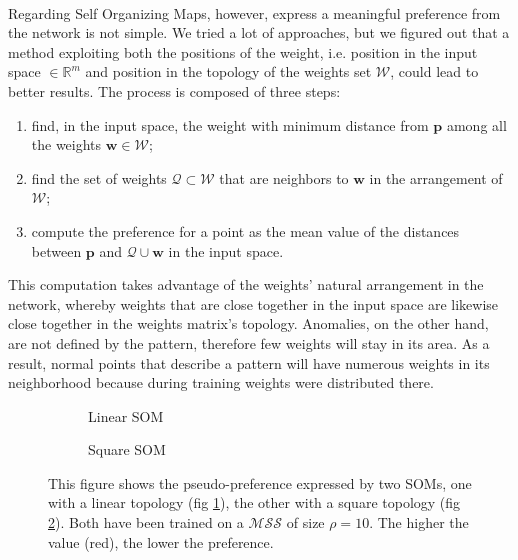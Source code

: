 \paragraph{}
Regarding Self Organizing Maps, however, express a meaningful preference from the network is not simple. We tried a lot of approaches, but we figured out that a method exploiting both the positions of the weight, i.e. position in the input space $\in \mathbb{R}^m$ and position in the topology of the weights set $\mathcal{W}$, could lead to better results. \newline
The process is composed of three steps:
\begin{enumerate}[label=(\roman*)]
    \item find, in the input space, the weight with minimum distance from $\textbf{p}$ among all the weights $\textbf{w} \in \mathcal{W}$;
    \item find the set of weights $\mathcal{Q} \subset \mathcal{W}$ that are neighbors to $\textbf{w}$ in the arrangement of $\mathcal{W}$;
    \item compute the preference for a point as the mean value of the distances between $\textbf{p}$ and $\mathcal{Q} \cup {\textbf{w}}$ in the input space.
\end{enumerate}
This computation takes advantage of the weights' natural arrangement in the network, whereby weights that are close together in the input space are likewise close together in the weights matrix's topology. Anomalies, on the other hand, are not defined by the pattern, therefore few weights will stay in its area. As a result, normal points that describe a pattern will have numerous weights in its neighborhood because during training weights were distributed there.

\begin{figure}[hb]
     \centering
     \begin{subfigure}[b]{0.45\textwidth}
         \centering
        
         \caption{Linear SOM}
         \label{subfig:linear_som_res}
     \end{subfigure}
     \hfill
     \begin{subfigure}[b]{0.45\textwidth}
         \centering
        
         \caption{Square SOM}
         \label{subfig:square_som_res}
     \end{subfigure}
     \caption{This figure shows the pseudo-preference expressed by two SOMs, one with a linear topology (fig \ref{subfig:linear_som_res}), the other with a square topology (fig \ref{subfig:square_som_res}). Both have been trained on a $\mathcal{MSS}$ of size $\rho = 10$. The higher the value (red), the lower the preference.}
     \label{fig:som_residuals}
\end{figure}

